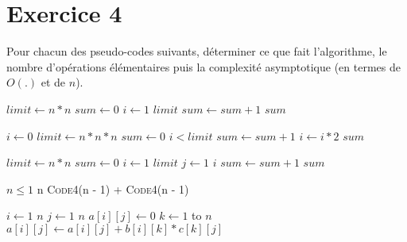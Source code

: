 \documentclass[a4paper,10pt]{article}
\begin{document}
\section*{Exercice 4}

Pour chacun des pseudo-codes suivants, déterminer ce que fait l'algorithme, le
nombre d'opérations élémentaires puis la complexité asymptotique (en termes de
$O(.)$ et de $n$).

\vspace{10pt}
\begin{codebox}
    \li $limit\gets n*n$
    \li $sum\gets 0$
    \li \For $i\gets 1$ \To $limit$
    \li \Do $sum\gets sum+1$
        \End
    \li \Return $sum$
    \End
\end{codebox}
\vspace{10pt}

\begin{codebox}
    \li $i\gets 0$
    \li $limit\gets n*n*n$
    \li $sum\gets 0$
    \li \While $i < limit$
    \li \Do $sum\gets sum+1$
    \li     $i\gets i*2$
        \End
    \li \Return $sum$
    \End
\end{codebox}
\vspace{10pt}

\begin{codebox}
    \li $limit\gets n*n$
    \li $sum\gets 0$
    \li \For $i\gets 1$ \To $limit$
    \li \Do \For $j\gets 1$ \To $i$
    \li     \Do $sum\gets sum+1$
            \End
        \End
    \li \Return $sum$
    \End
\end{codebox}
\vspace{10pt}

\begin{codebox}
    \li \If $n \leq 1$
        \Then
    \li     \Return n
    \li \Else
    \li     \Return \textsc{Code4}(n - 1) + \textsc{Code4}(n - 1)
       \End
\end{codebox}
\vspace{10pt}

\begin{codebox}
    \li \For $i\gets 1$ \To $n$
    \li \Do \For $j\gets 1$ \To $n$
    \li     \Do $a[i][j]\gets 0$
    \li         \For $k\gets 1$ to $n$
    \li         \Do $a[i][j]\gets a[i][j] + b[i][k] * c[k][j]$
                \End
            \End
        \End
    \End
\end{codebox}
\vspace{10pt}
\end{document}
